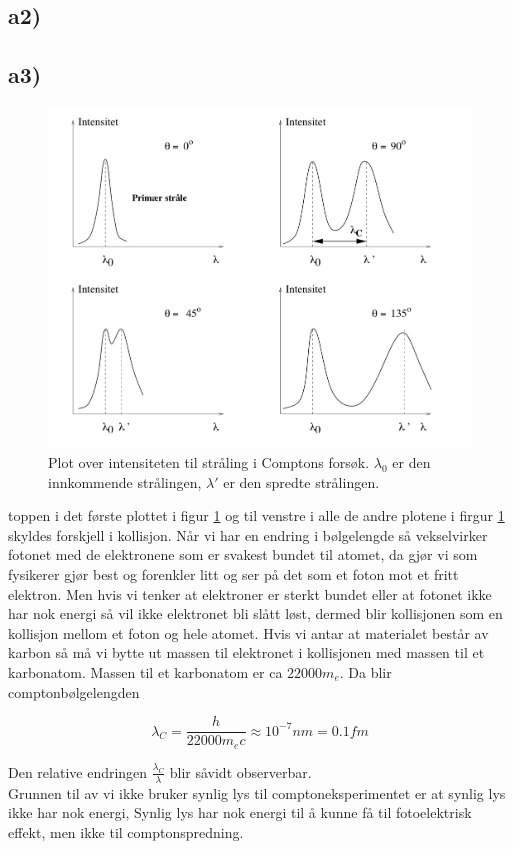 \documentclass[norsk,a4paper,12pt]{article}
\begin{document}
\subsection*{a2)}


\subsection*{a3)}


\begin{figure}[h]
\includegraphics[scale=0.4]{intensitetcompton}
\caption{Plot over intensiteten til stråling i Comptons forsøk. $\lambda_0$ er den innkommende strålingen, $\lambda'$ er den spredte strålingen.}
\label{fig:intensitetcompton}
\end{figure}

toppen i det første plottet i figur \ref{fig:intensitetcompton} og  til venstre i alle de andre plotene i firgur \ref{fig:intensitetcompton}  skyldes forskjell i kollisjon. Når vi har en endring i bølgelengde så vekselvirker fotonet med de elektronene som er svakest bundet til atomet, da gjør vi som fysikerer gjør best og forenkler litt og ser på det som et foton mot et fritt elektron. Men hvis vi tenker at elektroner er sterkt bundet eller at fotonet ikke har nok energi så vil ikke elektronet bli slått løst, dermed blir kollisjonen som en kollisjon mellom et foton og hele atomet. Hvis vi antar at materialet består av karbon så må vi bytte ut massen til elektronet i kollisjonen med massen til et karbonatom. Massen til et karbonatom er ca $22000m_e$. Da blir comptonbølgelengden 

\begin{equation}
\lambda_C = \frac{h}{22000m_ec} \approx 10^{-7} nm = 0.1fm
\end{equation}

Den relative endringen $\frac{\lambda_C}{\lambda}$ blir såvidt observerbar. 
\\

Grunnen til av vi ikke bruker synlig lys til comptoneksperimentet er at synlig lys ikke har nok energi, Synlig lys har nok energi til å kunne få til fotoelektrisk effekt, men ikke til comptonspredning.
\end{document}

